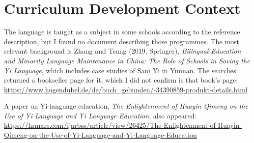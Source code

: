 \documentclass[12pt]{article}
\begin{document}
\section{Curriculum Development Context}
The language is taught as a subject in some schools according to the reference description, but I found no document describing those programmes. The most relevant background is Zhang and Tsung (2019, Springer), \emph{Bilingual Education and Minority Language Maintenance in China: The Role of Schools in Saving the Yi Language}, which includes case studies of Sani Yi in Yunnan. The searches returned a bookseller page for it, which I did not confirm is that book's page: \url{https://www.hugendubel.de/de/buch_gebunden/-34390859-produkt-details.html}

A paper on Yi-language education, \emph{The Enlightenment of Huayin Qimeng on the Use of Yi Language and Yi Language Education}, also appeared: \url{https://hrmars.com/ijarbss/article/view/26425/The-Enlightenment-of-Huayin-Qimeng-on-the-Use-of-Yi-Language-and-Yi-Language-Education}
\end{document}
